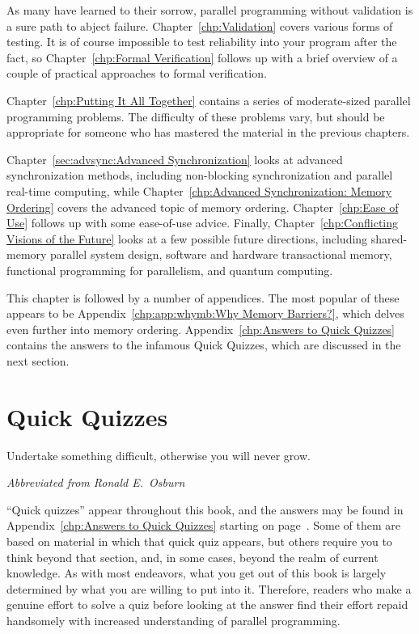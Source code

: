 As many have learned to their sorrow, parallel programming without
validation is a sure path to abject failure.
Chapter~\ref{chp:Validation} covers various forms of testing.
It is of course impossible to test reliability into your program
after the fact, so Chapter~\ref{chp:Formal Verification}
follows up with a brief overview of a couple of practical approaches to
formal verification.

Chapter~\ref{chp:Putting It All Together}
contains a series of moderate-sized parallel programming problems.
The difficulty of these problems vary, but should be appropriate for
someone who has mastered the material in the previous chapters.

Chapter~\ref{sec:advsync:Advanced Synchronization}
looks at advanced synchronization methods, including
non-blocking synchronization and parallel real-time computing,
while Chapter~\ref{chp:Advanced Synchronization: Memory Ordering}
covers the advanced topic of memory ordering.
Chapter~\ref{chp:Ease of Use} follows up with some ease-of-use advice.
Finally, Chapter~\ref{chp:Conflicting Visions of the Future}
looks at a few possible future directions, including
shared-memory parallel system design, software and hardware transactional
memory, functional programming for parallelism, and quantum computing.

This chapter is followed by a number of appendices.
The most popular of these appears to be
Appendix~\ref{chp:app:whymb:Why Memory Barriers?},
which delves even further into memory ordering.
Appendix~\ref{chp:Answers to Quick Quizzes}
contains the answers to the infamous Quick Quizzes, which are discussed in
the next section.

\section{Quick Quizzes}
\label{sec:howto:Quick Quizzes}
%
\epigraph{Undertake something difficult, otherwise you will never grow.}
	 {\emph{Abbreviated from Ronald E.~Osburn}}

``Quick quizzes'' appear throughout this book, and the answers may
be found in
Appendix~\ref{chp:Answers to Quick Quizzes} starting on
page~\pageref{chp:Answers to Quick Quizzes}.
Some of them are based on material in which that quick quiz
appears, but others require you to think beyond that section, and,
in some cases, beyond the realm of current knowledge.
As with most endeavors, what you get out of this book is largely
determined by what you are willing to put into it.
Therefore, readers who make a genuine effort to solve a quiz before
looking at the answer
find their effort repaid handsomely with increased understanding
of parallel programming.

